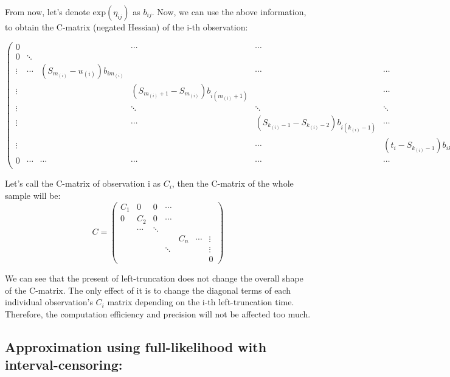 \documentclass[]{article}
\begin{document}
From now, let's denote \(\text{exp}(\eta_{ij})\) as \(b_{ij}\). Now, we
can use the above information, to obtain the C-matrix (negated Hessian)
of the i-th observation:

\begin{equation}
\begin{pmatrix} 
0 &   &  & \cdots & \cdots &  & \cdots \\
0 & \ddots  &   &  & && &  \\
\vdots & \cdots & (S_{m_{(i)}}-u_{(i)}) b_{im_{(i)}} &  & \cdots & \cdots & \cdots &  \\
\vdots & & &(S_{m_{(i)}+1}-S_{m_{(i)}})b_{i(m_{(i)}+1)} &  & \cdots & \cdots& \\
\vdots & & & \ddots  & \ddots & \ddots & \cdots& \\
\vdots  & & & \cdots & (S_{k_{(i)}-1}-S_{k_{(i)}-2})b_{i(k_{(i)}-1)}  & \cdots &  \\
\vdots  & && & \cdots & (t_i-S_{k_{(i)}-1})b_{ik_{(i)}} & \cdots\\
0 & \cdots &  \cdots & \cdots & \cdots & \cdots & \ddots \\
\end{pmatrix}
\end{equation}

Let's call the C-matrix of observation i as \(C_i\), then the C-matrix
of the whole sample will be: \begin{equation}
C = \begin{pmatrix} 
C_1 & 0 & 0 & \cdots & & \\ 
0 & C_2 & 0 & \cdots & & \\
  & \cdots & \ddots &  & & \\
& & & & C_n & \cdots & \vdots \\ 
& & & \ddots & &&\vdots \\
& & & & & & 0
\end{pmatrix}
\end{equation}

We can see that the present of left-truncation does not change the
overall shape of the C-matrix. The only effect of it is to change the
diagonal terms of each individual observation's \(C_i\) matrix depending
on the i-th left-truncation time. Therefore, the computation efficiency
and precision will not be affected too much.

\newpage

\hypertarget{approximation-using-full-likelihood-with-interval-censoring}{%
\subsection{Approximation using full-likelihood with
interval-censoring:}\label{approximation-using-full-likelihood-with-interval-censoring}}
\end{document}

